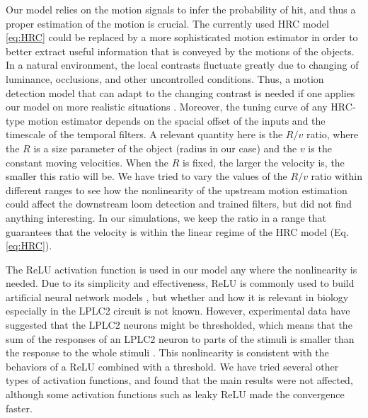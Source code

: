 \documentclass[pdftex,9pt,lineno]{elife}
\begin{document}
Our model relies on the motion signals to infer the probability of hit, and thus a proper estimation of the motion is crucial. The currently used HRC model \ref{eq:HRC} could be replaced by a more sophisticated motion estimator in order to better extract useful information that is conveyed by the motions of the objects. In a natural environment, the local contrasts fluctuate greatly due to changing of luminance, occlusions, and other uncontrolled conditions. Thus, a motion detection model that can adapt to the changing contrast is needed if one applies our model on more realistic situations \citep{drews2020dynamic}. Moreover, the tuning curve of any HRC-type motion estimator depends on the spacial offset of the inputs and the timescale of the temporal filters. A relevant quantity here is the $R/v$ ratio, where the $R$ is a size parameter of the object (radius in our case) and the $v$ is the constant moving velocities. When the $R$ is fixed, the larger the velocity is, the smaller this ratio will be. We have tried to vary the values of the $R/v$ ratio within different ranges to see how the nonlinearity of the upstream motion estimation could affect the downstream loom detection and trained filters, but did not find anything interesting. In our simulations, we keep the ratio in a range that guarantees that the velocity is within the linear regime of the HRC model (Eq. \ref{eq:HRC}).


The ReLU activation function is used in our model any where the nonlinearity is needed. Due to its simplicity and effectiveness, ReLU is commonly used to build artificial neural network models \citep{glorot2011deep}, but whether and how it is relevant in biology especially in the LPLC2 circuit is not known. However, experimental data have suggested that the LPLC2 neurons might be thresholded, which means that the sum of the responses of an LPLC2 neuron to parts of the stimuli is smaller than the response to the whole stimuli \citep{klapoetke2017ultra}. This nonlinearity is consistent with the behaviors of a ReLU combined with a threshold. We have tried several other types of activation functions, and found that the main results were not affected, although some activation functions such as leaky ReLU made the convergence faster.
\end{document}
